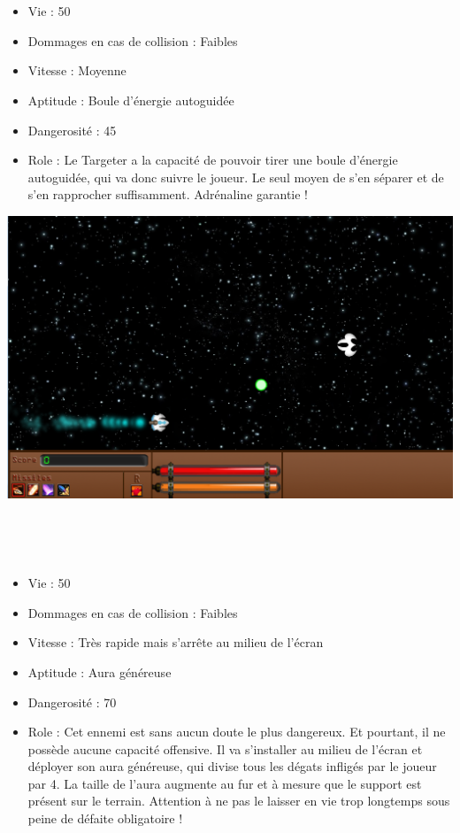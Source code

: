 				\par~
				\item[$\bullet$ Targeter]
				\par~
				\begin{itemize}
					\item Vie : 50
					\item Dommages en cas de collision : Faibles
					\item Vitesse : Moyenne
					\item Aptitude : Boule d'énergie autoguidée
					\item Dangerosité : 45%
					\item Role : Le Targeter a la capacité de pouvoir tirer une boule d'énergie autoguidée, qui va donc suivre le joueur. Le seul moyen de s'en séparer et de s'en rapprocher suffisamment. Adrénaline garantie !
				\end{itemize}
\includegraphics{images/vaisseaux/targeter.png}
				\par~
				\item[$\bullet$ Support]
				\par~
				\begin{itemize}
					\item Vie : 50
					\item Dommages en cas de collision : Faibles
					\item Vitesse : Très rapide mais s'arrête au milieu de l'écran
					\item Aptitude : Aura généreuse
					\item Dangerosité : 70%
					\item Role : Cet ennemi est sans aucun doute le plus dangereux. Et pourtant, il ne possède aucune capacité offensive. Il va s'installer au milieu de l'écran et déployer son aura généreuse, qui divise tous les dégats infligés par le joueur par 4. La taille de l'aura augmente au fur et à mesure que le support est présent sur le terrain. Attention à ne pas le laisser en vie trop longtemps sous peine de défaite obligatoire !
				\end{itemize}
